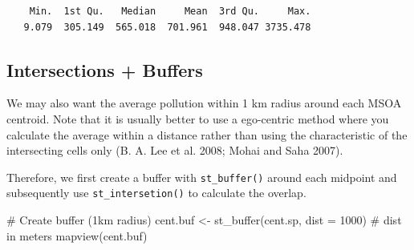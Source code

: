 \documentclass[
  letterpaper,
  DIV=11,
  numbers=noendperiod]{scrreprt}
\newenvironment{Shaded}{\begin{snugshade}}{\end{snugshade}}
\newcommand{\AttributeTok}[1]{\textcolor[rgb]{0.40,0.45,0.13}{#1}}
\newcommand{\CommentTok}[1]{\textcolor[rgb]{0.37,0.37,0.37}{#1}}
\newcommand{\DecValTok}[1]{\textcolor[rgb]{0.68,0.00,0.00}{#1}}
\newcommand{\FunctionTok}[1]{\textcolor[rgb]{0.28,0.35,0.67}{#1}}
\newcommand{\NormalTok}[1]{\textcolor[rgb]{0.00,0.23,0.31}{#1}}
\newcommand{\OtherTok}[1]{\textcolor[rgb]{0.00,0.23,0.31}{#1}}
\begin{document}
\begin{verbatim}
    Min.  1st Qu.   Median     Mean  3rd Qu.     Max. 
   9.079  305.149  565.018  701.961  948.047 3735.478 
\end{verbatim}

\hypertarget{intersections-buffers}{%
\subsection{Intersections + Buffers}\label{intersections-buffers}}

We may also want the average pollution within 1 km radius around each
MSOA centroid. Note that it is usually better to use a ego-centric
method where you calculate the average within a distance rather than
using the characteristic of the intersecting cells only (B. A. Lee et
al. 2008; Mohai and Saha 2007).

Therefore, we first create a buffer with \texttt{st\_buffer()} around
each midpoint and subsequently use \texttt{st\_intersetion()} to
calculate the overlap.

\begin{Shaded}
\begin{Highlighting}[]
\CommentTok{\# Create buffer (1km radius)}
\NormalTok{cent.buf }\OtherTok{\textless{}{-}} \FunctionTok{st\_buffer}\NormalTok{(cent.sp, }
                      \AttributeTok{dist =} \DecValTok{1000}\NormalTok{) }\CommentTok{\# dist in meters}
\FunctionTok{mapview}\NormalTok{(cent.buf)}
\end{Highlighting}
\end{Shaded}
\end{document}
